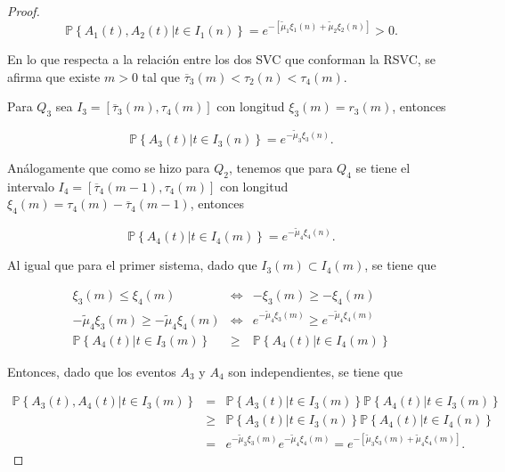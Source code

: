 \documentclass{article}
\newcommand{\prob}{\mathbb{P}}
\numberwithin{equation}{section}
\begin{document}
{\begin{proof}
\begin{equation}
\prob\left\{A_{1}\left(t\right),A_{2}\left(t\right)|t\in I_{1}\left(n\right)\right\}
=e^{-\left[\tilde{\mu}_{1}\xi_{1}\left(n\right)+\tilde{\mu}_{2}\xi_{2}
\left(n\right)\right]}>0.
\end{equation}

En lo que respecta a la relaci\'on entre los dos SVC que conforman la RSVC, se afirma que existe $m>0$ tal que $\overline{\tau}_{3}\left(m\right)<\tau_{2}\left(n\right)<\tau_{4}\left(m\right)$.

Para $Q_{3}$ sea $I_{3}=\left[\overline{\tau}_{3}\left(m\right),\tau_{4}\left(m\right)\right]$ con longitud  $\xi_{3}\left(m\right)=r_{3}\left(m\right)$, entonces 

\begin{equation}
\prob\left\{A_{3}\left(t\right)|t\in I_{3}\left(n\right)\right\}=e^{-\tilde{\mu}_{3}\xi_{3}\left(n\right)}.
\end{equation} 

An\'alogamente que como se hizo para $Q_{2}$, tenemos que para $Q_{4}$ se tiene el intervalo $I_{4}=\left[\overline{\tau}_{4}\left(m-1\right),\tau_{4}\left(m\right)\right]$ con longitud $\xi_{4}\left(m\right)=\tau_{4}\left(m\right)-\overline{\tau}_{4}\left(m-1\right)$, entonces


\begin{equation}
\prob\left\{A_{4}\left(t\right)|t\in I_{4}\left(m\right)\right\}=e^{-\tilde{\mu}_{4}\xi_{4}\left(n\right)}.
\end{equation} 

Al igual que para el primer sistema, dado que $I_{3}\left(m\right)\subset I_{4}\left(m\right)$, se tiene que

\begin{eqnarray*}
\xi_{3}\left(m\right)\leq\xi_{4}\left(m\right)&\Leftrightarrow& -\xi_{3}\left(m\right)\geq-\xi_{4}\left(m\right)
\\
-\tilde{\mu}_{4}\xi_{3}\left(m\right)\geq-\tilde{\mu}_{4}\xi_{4}\left(m\right)&\Leftrightarrow&
e^{-\tilde{\mu}_{4}\xi_{3}\left(m\right)}\geq e^{-\tilde{\mu}_{4}\xi_{4}\left(m\right)}\\
\prob\left\{A_{4}\left(t\right)|t\in I_{3}\left(m\right)\right\}&\geq&
\prob\left\{A_{4}\left(t\right)|t\in I_{4}\left(m\right)\right\}
\end{eqnarray*}

Entonces, dado que los eventos $A_{3}$ y $A_{4}$ son independientes, se tiene que

\begin{eqnarray*}
\prob\left\{A_{3}\left(t\right),A_{4}\left(t\right)|t\in I_{3}\left(m\right)\right\}&=&
\prob\left\{A_{3}\left(t\right)|t\in I_{3}\left(m\right)\right\}
\prob\left\{A_{4}\left(t\right)|t\in I_{3}\left(m\right)\right\}\\
&\geq&
\prob\left\{A_{3}\left(t\right)|t\in I_{3}\left(n\right)\right\}
\prob\left\{A_{4}\left(t\right)|t\in I_{4}\left(n\right)\right\}\\
&=&e^{-\tilde{\mu}_{3}\xi_{3}\left(m\right)}e^{-\tilde{\mu}_{4}\xi_{4}
\left(m\right)}
=e^{-\left[\tilde{\mu}_{3}\xi_{3}\left(m\right)+\tilde{\mu}_{4}\xi_{4}
\left(m\right)\right]}.
\end{eqnarray*}



\end{proof}}
\end{document}
